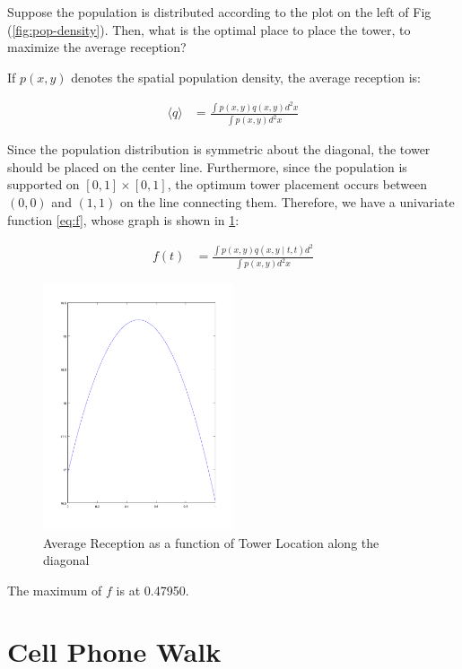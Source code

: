 \documentclass{article}
\begin{document}
Suppose the population is distributed according to the plot on the left
	of  Fig (\ref{fig:pop-density}).
Then, what is the optimal place to place the tower, to maximize the average
	reception?

If $p(x,y)$ denotes the spatial population density, the average reception
	is:

\begin{align}
\langle q \rangle & = 
	\frac{ \int p(x,y) q(x,y) d^2x }{\int p(x,y) d^2x}
\end{align}

Since the population distribution is symmetric about the diagonal, the tower
	should be placed on the center line.
Furthermore, since the population is supported on $[0,1] \times [0,1]$,
	the optimum tower placement occurs between $(0,0)$ and $(1,1)$
	on the line connecting them.
Therefore, we have a univariate function \ref{eq:f}, whose graph is shown
	in \ref{fig:f}:

\begin{align}
f(t) & = 
	\frac{ \int p(x,y) q(x,y \mid t, t) d^2}{\int p(x,y) d^2x}
	\label{eq:f}
\end{align}

\begin{figure}[h!]
\includegraphics[width=0.5\textwidth]{tower-locations.png}
\caption{Average Reception as a function of Tower Location along the diagonal}
\label{fig:f}
\end{figure}

The maximum of $f$ is at 0.47950.

\section{Cell Phone Walk}
\end{document}
